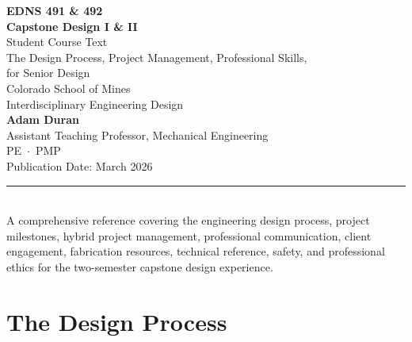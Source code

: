 \documentclass[11pt,letterpaper,twoside,openany]{book}
\begin{document}

\begin{titlepage}
\begin{center}
\vspace*{2cm}
{\Huge\bfseries\sffamily\textcolor{MinesBlue}{EDNS 491 \& 492}}\\[0.5cm]
{\Huge\bfseries\sffamily\textcolor{MinesBlue}{Capstone Design I \& II}}\\[2cm]
{\huge\sffamily\textcolor{MinesBlue}{Student Course Text}}\\[1cm]
{\Large\sffamily The Design Process, Project Management, Professional Skills,}\\[0.2cm]
{\Large\sffamily for Senior Design}\\[3cm]
{\large\sffamily\textcolor{MinesSilver}{Colorado School of Mines}}\\[0.3cm]
{\large\sffamily\textcolor{MinesSilver}{Interdisciplinary Engineering Design}}\\[1.5cm]
{\Large\sffamily\textbf{Adam Duran}}\\[0.2cm]
{\normalsize\sffamily Assistant Teaching Professor, Mechanical Engineering}\\[0.2cm]
{\normalsize\sffamily\textcolor{MinesSilver}{PE \,$\cdot$\, PMP}}\\[1.5cm]
{\normalsize\sffamily\textcolor{MinesSilver}{Publication Date: March 2026}}\\[0.8cm]
\textcolor{MinesBlue}{\rule{0.6\textwidth}{1pt}}\\[0.5cm]
{\normalsize\sffamily A comprehensive reference covering the engineering design process, project milestones, hybrid project management, professional communication, client engagement, fabrication resources, technical reference, safety, and professional ethics for the two-semester capstone design experience.}
\end{center}
\end{titlepage}


\frontmatter
\tableofcontents
\newpage





\mainmatter

\part{The Design Process}
\end{document}

